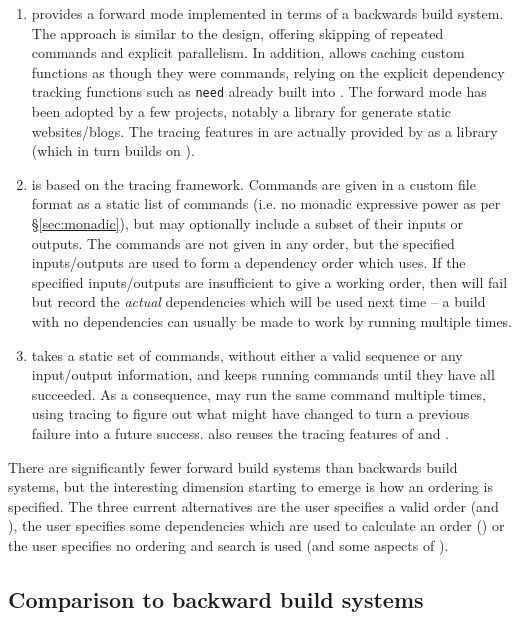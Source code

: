 \begin{enumerate}
\item \Shake \cite{shake} provides a forward mode implemented in terms of a backwards build system. The approach is similar to the \Fabricate design, offering skipping of repeated commands and explicit parallelism. In addition, \Shake allows caching custom functions as though they were commands, relying on the explicit dependency tracking functions such as \texttt{need} already built into \Shake. The forward mode has been adopted by a few projects, notably a library for generate static websites/blogs. The tracing features in \Rattle are actually provided by \Shake as a library (which in turn builds on \Fsatrace).
\item \Fac \cite{fac} is based on the \Bigbro tracing framework. Commands are given in a custom file format as a static list of commands (i.e. no monadic expressive power as per \S\ref{sec:monadic}), but may optionally include a subset of their inputs or outputs. The commands are not given in any order, but the specified inputs/outputs are used to form a dependency order which \Fac uses. If the specified inputs/outputs are insufficient to give a working order, then \Fac will fail but record the \emph{actual} dependencies which will be used next time -- a build with no dependencies can usually be made to work by running \Fac multiple times.
\item \Stroll \cite{stroll} takes a static set of commands, without either a valid sequence or any input/output information, and keeps running commands until they have all succeeded. As a consequence, \Stroll may run the same command multiple times, using tracing to figure out what might have changed to turn a previous failure into a future success. \Stroll also reuses the tracing features of \Shake and \Fsatrace.
\end{enumerate}

There are significantly fewer forward build systems than backwards build systems, but the interesting dimension starting to emerge is how an ordering is specified. The three current alternatives are the user specifies a valid order (\Fabricate and \Rattle), the user specifies some dependencies which are used to calculate an order (\Fac) or the user specifies no ordering and search is used (\Stroll and some aspects of \Fac).

\subsection{Comparison to backward build systems}

